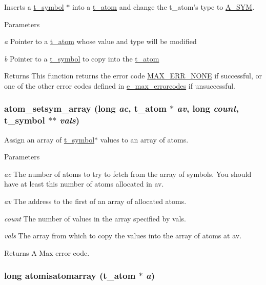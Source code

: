 Inserts a \hyperlink{structt__symbol}{t\_\-symbol} $\ast$ into a \hyperlink{structt__atom}{t\_\-atom} and change the t\_\-atom's type to \hyperlink{group__atom_gga8aa6700e9f00b132eb376db6e39ade47a2d661c2a5d949566e2f1944c99bceeea}{A\_\-SYM}. 
\begin{DoxyParams}{Parameters}
\item[{\em a}]Pointer to a \hyperlink{structt__atom}{t\_\-atom} whose value and type will be modified \item[{\em b}]Pointer to a \hyperlink{structt__symbol}{t\_\-symbol} to copy into the \hyperlink{structt__atom}{t\_\-atom}\end{DoxyParams}
\begin{DoxyReturn}{Returns}
This function returns the error code \hyperlink{group__misc_gga0764dd6c02b76cca7d053ae50555d69da6d22f77fef8b1e1b074cef5d29d935fd}{MAX\_\-ERR\_\-NONE} if successful, or one of the other error codes defined in \hyperlink{group__misc_ga0764dd6c02b76cca7d053ae50555d69d}{e\_\-max\_\-errorcodes} if unsuccessful. 
\end{DoxyReturn}
\hypertarget{group__atom_ga7955dbb1679166ac7bb15bfc1ee9b7f8}{
\subsubsection[{atom\_\-setsym\_\-array}]{ atom\_\-setsym\_\-array (long {\em ac}, \/  {\bf t\_\-atom} $\ast$ {\em av}, \/  long {\em count}, \/  {\bf t\_\-symbol} $\ast$$\ast$ {\em vals})}}
\label{group__atom_ga7955dbb1679166ac7bb15bfc1ee9b7f8}


Assign an array of \hyperlink{structt__symbol}{t\_\-symbol}$\ast$ values to an array of atoms. 
\begin{DoxyParams}{Parameters}
\item[{\em ac}]The number of atoms to try to fetch from the array of symbols. You should have at least this number of atoms allocated in av. \item[{\em av}]The address to the first of an array of allocated atoms. \item[{\em count}]The number of values in the array specified by vals. \item[{\em vals}]The array from which to copy the values into the array of atoms at av. \end{DoxyParams}
\begin{DoxyReturn}{Returns}
A Max error code. 
\end{DoxyReturn}
\hypertarget{group__atom_gaf85b0f40648c68c0e32168029489575b}{
\subsubsection[{atomisatomarray}]{\setlength{\rightskip}{0pt plus 5cm}long atomisatomarray ({\bf t\_\-atom} $\ast$ {\em a})}}
\label{group__atom_gaf85b0f40648c68c0e32168029489575b}


